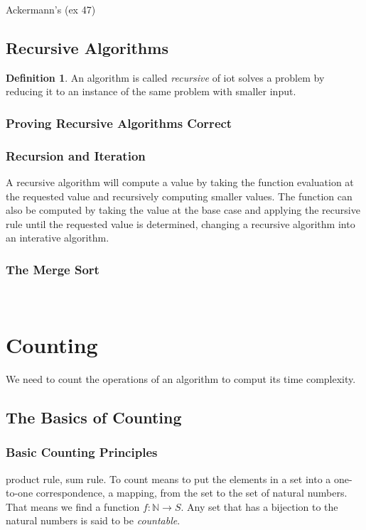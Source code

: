 \documentclass[11pt]{book} %
\theoremstyle {definition}
\newtheorem {definition}{Definition}[section]
\theoremstyle {remark}
\begin{document}
Ackermann's (ex 47)

\section {Recursive Algorithms}
  \begin {definition}
An algorithm is called \textit{recursive} of iot solves a problem by reducing it to an instance of the same problem with smaller input.
\end{definition}

  \subsection {Proving Recursive Algorithms Correct}
  \subsection {Recursion and Iteration}
A recursive algorithm will compute a value by taking the function evaluation at the requested value and recursively computing smaller values. The function can also be computed by taking the value at the base case and applying the recursive rule until the requested value is determined, changing a recursive algorithm into an interative algorithm.

  \subsection {The Merge Sort}

\

\newpage


\chapter {Counting}
We need to count the operations of an algorithm to comput its time complexity.

\section {The Basics of Counting}
    \subsection {Basic Counting Principles}
product rule, sum rule.
To count means to put the elements in a set into a one-to-one correspondence, a mapping, from the set to the set of natural numbers. That means we find a function $f:\mathbb{N} \rightarrow S$. 
Any set that has a bijection to the natural numbers is said to be \textit{countable}. 
\end{document}
